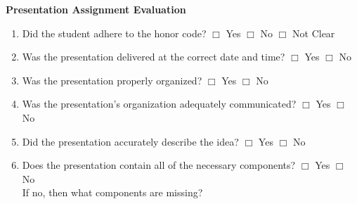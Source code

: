 \documentclass[letterpaper, 10pt]{article} %
\begin{document}
\large{

\begin{center}{\bf Presentation Assignment Evaluation} \end{center}

\begin{enumerate}

\setlength{\itemsep}{1pt}

\item Did the student adhere to the honor code? \hspace*{.05in}  $\Box$ Yes
  \hspace*{.05in} $\Box$ No \hspace*{.05in}  $\Box$ Not Clear

\item Was the presentation delivered at the correct date and
  time? \hspace*{.05in} $\Box$ Yes
  \hspace*{.05in} $\Box$ No

\item Was the presentation properly organized? \hspace*{.05in} $\Box$ Yes
  \hspace*{.05in} $\Box$ No 

\item Was the presentation's organization adequately
  communicated? \hspace*{.05in} $\Box$ Yes
  \hspace*{.05in} $\Box$ No

\item Did the presentation accurately describe the
  idea? \hspace*{.05in} $\Box$ Yes
  \hspace*{.05in} $\Box$ No


\item Does the presentation contain all of the necessary
  components? \hspace*{.05in} $\Box$ Yes
  \hspace*{.05in} $\Box$ No \\ \hspace*{.05in} If no, then what
  components are missing? \vspace*{-.05in}


\end{enumerate}}
\end{document}
